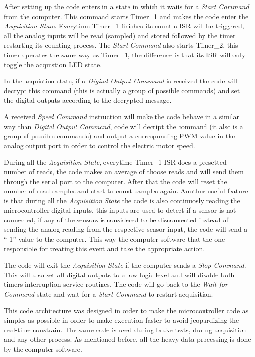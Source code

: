 	After setting up the code enters in a state in which it waits for a \textit{Start Command} from the computer. This command starts Timer\_1 and makes the code enter the \textit{Acquisition State}. Everytime Timer\_1 finishes its count a ISR will be triggered, all the analog inputs will be read (sampled) and stored followed by the timer restarting its counting process. The \textit{Start Command} also starts Timer\_2, this timer operates the same way as Timer\_1, the difference is that its ISR will only toggle the acquistion LED state.
	\par
	In the acquistion state, if a \textit{Digital Output Command} is received the code will decrypt this command (this is actually a group of possible commands) and set the digital outputs according to the decrypted message.
	\par
	A received \textit{Speed Command} instruction will make the code behave in a similar way than \textit{Digital Output Command}, code will decript the command (it also is a group of possible commands) and output a corresponding PWM value in the analog output port in order to control the electric motor speed.
	\par
	During all the \textit{Acquisition State}, everytime Timer\_1 ISR does a presetted number of reads, the code makes an average of thoose reads and will send them through the serial port to the computer. After that the code will reset the number of read samples and start to count samples again. Another useful feature is that during all the \textit{Acquisition State} the code is also continuosly reading the microcontroller digital inputs, this inputs are used to detect if a sensor is not connected, if any of the sensors is considered to be disconnected instead of sending the analog reading from the respective sensor input, the code will send a ``-1'' value to the computer. This way the computer software that the one responsible for treating this event and take the appropriate action.
	\par
	The code will exit the \textit{Acquisition State} if the computer sends a \textit{Stop Command}. This will also set all digital outputs to a low logic level and will disable both timers interruption service routines. The code will go back to the \textit{Wait for Command} state and wait for a \textit{Start Command} to restart acquisition. 
	\par
	This code architecture was designed in order to make the microcontroller code as simples as possible in order to make execution faster to avoid jeopardizing the real-time constrain. The same code is used during brake tests, during acquisition and any other process. As mentioned before, all the heavy data processing is done by the computer software.
